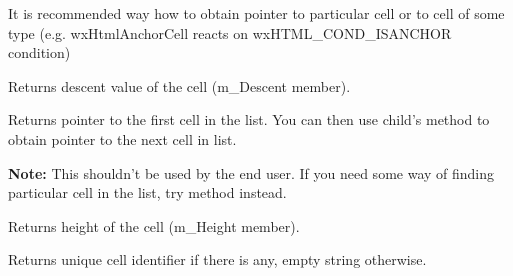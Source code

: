 It is recommended way how to obtain pointer to particular cell or
to cell of some type (e.g. wxHtmlAnchorCell reacts on
wxHTML\_COND\_ISANCHOR condition)





\begin{twocollist}\itemsep=0pt
\end{twocollist}

\label{wxhtmlcellgetdescent}


Returns descent value of the cell (m\_Descent member). 

\label{wxhtmlcellgetfirstchild}


Returns pointer to the first cell in the list.
You can then use child's 
method to obtain pointer to the next cell in list.

{\bf Note:} This shouldn't be used by the end user. If you need some way of
finding particular cell in the list, try  method
instead.

\label{wxhtmlcellgetheight}


Returns height of the cell (m\_Height member).

\label{wxhtmlcellgetid}


Returns unique cell identifier if there is any, empty string otherwise.

\label{wxhtmlcellgetlink}


